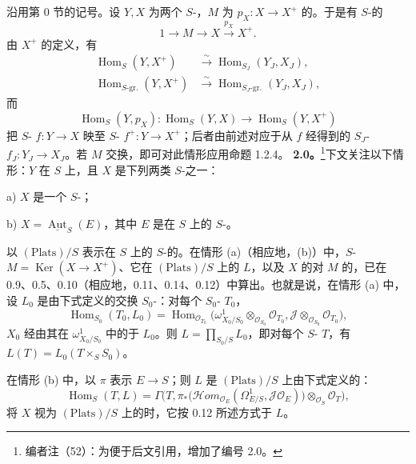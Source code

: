 沿用第 0 节的记号。设 $Y,X$ 为两个 $S$-，$M$ 为 $p_X:X\to X^+$ 的。于是有 $S$-的
\[
 1\longrightarrow M\longrightarrow X\xrightarrow{p_X}X^+.
\]
由 $X^+$ 的定义，有
\[
\begin{aligned}
 \operatorname{Hom}_S(Y,X^+)&\xrightarrow{\sim}\operatorname{Hom}_{S_J}(Y_J,X_J),\\
 \operatorname{Hom}_{S\text{-gr.}}(Y,X^+)&\xrightarrow{\sim}\operatorname{Hom}_{S_J\text{-gr.}}(Y_J,X_J),
\end{aligned}
\]
而
\[
 \operatorname{Hom}_S(Y,p_X):\operatorname{Hom}_S(Y,X)\longrightarrow\operatorname{Hom}_S(Y,X^+)
\]
把 $S$- $f:Y\to X$ 映至 $S$- $f^+:Y\to X^+$；后者由前述对应于从 $f$ 经得到的 $S_J$- $f_J:Y_J\to X_J$。若 $M$ 交换，即可对此情形应用命题 1.2.4。
\textbf{2.0。}\footnote{编者注（52）：为便于后文引用，增加了编号 2.0。}下文关注以下情形：$Y$ 在 $S$ 上，且 $X$ 是下列两类 $S$-之一：

 a) $X$ 是一个 $S$-；

 b) $X=\underline{\operatorname{Aut}}_S(E)$，其中 $E$ 是在 $S$ 上的 $S$-。

以 $(\mathrm{Plats})/S$ 表示在 $S$ 上的 $S$-的。在情形 (a)（相应地，(b)）中，$S$- $M=\operatorname{Ker}(X\to X^+)$、它在 $(\mathrm{Plats})/S$ 上的 $L$，以及 $X$ 的对 $M$ 的，已在 0.9、0.5、0.10（相应地，0.11、0.14、0.12）中算出。也就是说，在情形 (a) 中，设 $L_0$ 是由下式定义的交换 $S_0$-：对每个 $S_0$- $T_0$，
\[
 \operatorname{Hom}_{S_0}(T_0,L_0)=
 \operatorname{Hom}_{\mathcal O_{T_0}}
 \bigl(\omega^1_{X_0/S_0}\otimes_{\mathcal O_{S_0}}\mathcal O_{T_0},
 \mathcal J\otimes_{\mathcal O_{S_0}}\mathcal O_{T_0}\bigr),
\]
$X_0$ 经由其在 $\omega^1_{X_0/S_0}$ 中的于 $L_0$。则 $L=\prod_{S_0/S}L_0$，即对每个 $S$- $T$，有 $L(T)=L_0(T\times_S S_0)$。

在情形 (b) 中，以 $\pi$ 表示 $E\to S$；则 $L$ 是 $(\mathrm{Plats})/S$ 上由下式定义的：
\[
 \operatorname{Hom}_S(T,L)=
 \Gamma\bigl(T,\pi_*\bigl(\mathscr{H}\!om_{\mathcal O_E}
 (\Omega^1_{E/S},\mathcal J\mathcal O_E)\bigr)\otimes_{\mathcal O_S}\mathcal O_T\bigr),
\]
将 $X$ 视为 $(\mathrm{Plats})/S$ 上的时，它按 0.12 所述方式于 $L$。

